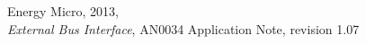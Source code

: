 \clearpage{}
\begin{thebibliography}{1}

	Energy Micro, 2013,\\
	\textsl{External Bus Interface}, AN0034 Application Note, revision 1.07

\end{thebibliography}

